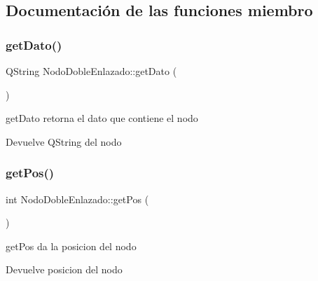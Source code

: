 \subsection{Documentación de las funciones miembro}
\mbox{\label{class_nodo_doble_enlazado_a2c464eb4789b8ad28891a308b6f52616}} 
\subsubsection{\texorpdfstring{get\+Dato()}{getDato()}}
{\footnotesize\ttfamily Q\+String Nodo\+Doble\+Enlazado\+::get\+Dato (\begin{DoxyParamCaption}{ }\end{DoxyParamCaption})\hspace{0.3cm}{\ttfamily [inline]}}



get\+Dato retorna el dato que contiene el nodo 

\begin{DoxyReturn}{Devuelve}
Q\+String del nodo 
\end{DoxyReturn}
\mbox{\label{class_nodo_doble_enlazado_a73808d8a3ae1ca8094a5e6f0670277ca}} 
\subsubsection{\texorpdfstring{get\+Pos()}{getPos()}}
{\footnotesize\ttfamily int Nodo\+Doble\+Enlazado\+::get\+Pos (\begin{DoxyParamCaption}{ }\end{DoxyParamCaption})\hspace{0.3cm}{\ttfamily [inline]}}



get\+Pos da la posicion del nodo 

\begin{DoxyReturn}{Devuelve}
posicion del nodo 
\end{DoxyReturn}
\mbox{\label{class_nodo_doble_enlazado_a7fe3c0a57d300f948bf1228da964a673}} 
